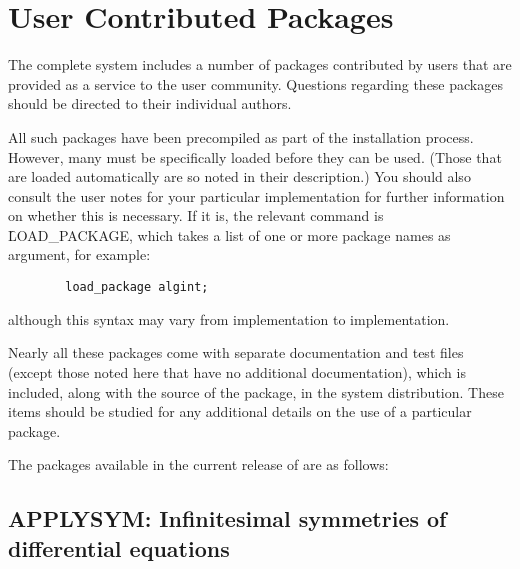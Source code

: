 %
%



\chapter{User Contributed Packages} 
\label{chap-user}
The complete {\REDUCE} system includes a number of packages contributed by
users that are provided as a service to the user community.  Questions
regarding these packages should be directed to their individual authors.

All such packages have been precompiled as part of the installation process.
However, many must be specifically loaded before they can be used. (Those
that are loaded automatically are so noted in their description.) You should
also consult the user notes for your particular implementation for further
information on whether this is necessary.  If it is, the relevant command is
\f{LOAD\_PACKAGE}, which takes a list of one or
more package names as argument, for example:

\begin{verbatim}
        load_package algint;
\end{verbatim}
although this syntax may vary from implementation to implementation.

Nearly all these packages come with separate documentation and test files
(except those noted here that have no additional documentation), which is
included, along with the source of the package, in the {\REDUCE} system
distribution.  These items should be studied for any additional details on
the use of a particular package.

\let\origsectionmark=\sectionmark
\def\sectionmark#1{}


The packages available in the current release of {\REDUCE} are as follows:

\newpage

\section{APPLYSYM: Infinitesimal symmetries of differential equations}
\label{package:APPLYSYM}

